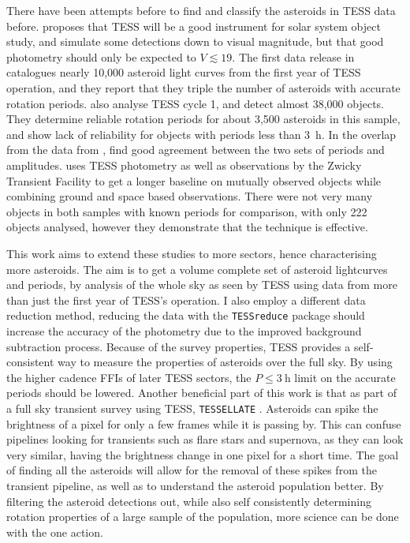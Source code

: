 \documentclass[12pt]{article}
\begin{document}
There have been attempts before to find and classify the asteroids in TESS data before.
\citet{Pal2018} proposes that TESS will be a good instrument for solar system object study, and simulate some detections down to  visual magnitude, but that good photometry should only be expected to $V \lesssim 19$.  
The first data release in \citet{Pal2020} catalogues nearly 10,000 asteroid light curves from the first year of TESS operation, and they report that they triple the number of asteroids with accurate rotation periods.
\citet{McNeill2023} also analyse TESS cycle 1, and detect almost 38,000 objects.
They determine reliable rotation periods for about 3,500 asteroids in this sample, and show lack of reliability for objects with periods less than \qty{3}{\hour}. 
In the overlap from the data from \citet{Pal2020}, \citeauthor{McNeill2023} find good agreement between the two sets of periods and amplitudes. 
\citet{Gowanlock2024} uses TESS photometry as well as  observations by the Zwicky Transient Facility \citep[ZTF, ][]{Bellm2018} to get a longer baseline on mutually observed objects while combining ground and space based observations. 
There were not very many objects in both samples with known periods for comparison, with only 222 objects analysed, however they demonstrate that the technique is effective.  

This work aims to extend these studies to more sectors, hence characterising more asteroids.
The aim is to get a volume complete set of asteroid lightcurves and periods, by analysis of the whole sky as seen by TESS using data from more than just the first year of TESS's operation.
I also employ a different data reduction method, reducing the data with the \texttt{TESSreduce} package \citep{Ridden-Harper2021} should increase the accuracy of the photometry due to the improved background subtraction process.
Because of the survey properties, TESS provides a self-consistent way to measure the properties of asteroids over the full sky.
By using the higher cadence FFIs of later TESS sectors, the $P\leq\qty{3}{\hour}$ limit on the accurate periods \citep[as found by ][]{McNeill2023} should be lowered.  
Another beneficial part of this work is that as part of a full sky transient survey using TESS, \texttt{TESSELLATE} \citep{TESSELATE}.
Asteroids can spike the brightness of a pixel for only a few frames while it is passing by.
This can confuse pipelines looking for  transients such as flare stars and supernova, as they can look very similar, having the brightness change in one pixel for a short time.
The goal of finding all the asteroids will allow for the removal of these spikes from the transient pipeline, as well as to understand the asteroid population better.
By filtering the asteroid detections out, while also self consistently determining rotation properties of a large sample of the population, more science can be done with the one action. 
\end{document}
